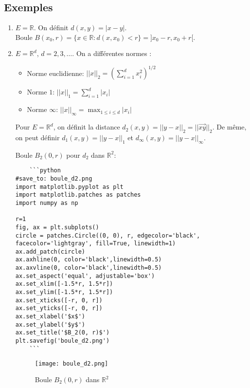 \documentclass[oneside]{book}
\begin{document}
\subsection{Exemples}

\begin{example}
\begin{enumerate}
    \item $E = \mathbb{R}$. On définit $d(x, y) = |x - y|$. \\
    Boule $B(x_0, r) = \{x \in \mathbb{R} : d(x, x_0) < r \} = ]x_0 - r, x_0 + r[$.

    \item $E = \mathbb{R}^d$, $d = 2, 3, \dots$. On a différentes normes :
    \begin{itemize}
        \item Norme euclidienne: $||x||_2 = (\sum_{i=1}^d x_i^2)^{1/2}$
        \item Norme $1$: $||x||_1 = \sum_{i=1}^d |x_i|$
        \item Norme $\infty$: $||x||_\infty = \max_{1 \leq i \leq d} |x_i|$
    \end{itemize}
    Pour $E = \mathbb{R}^d$, on définit la distance $d_2(x, y) = ||y - x||_2 = ||\overrightarrow{xy}||_2$. De même, on peut définir $d_1(x, y) = ||y - x||_1$ et $d_\infty(x, y) = ||y - x||_\infty$.

    Boule $B_2(0, r)$ pour $d_2$ dans $\mathbb{R}^2$:

    \begin{verbatim}
    ```python
#save_to: boule_d2.png
import matplotlib.pyplot as plt
import matplotlib.patches as patches
import numpy as np

r=1
fig, ax = plt.subplots()
circle = patches.Circle((0, 0), r, edgecolor='black', facecolor='lightgray', fill=True, linewidth=1)
ax.add_patch(circle)
ax.axhline(0, color='black',linewidth=0.5)
ax.axvline(0, color='black',linewidth=0.5)
ax.set_aspect('equal', adjustable='box')
ax.set_xlim([-1.5*r, 1.5*r])
ax.set_ylim([-1.5*r, 1.5*r])
ax.set_xticks([-r, 0, r])
ax.set_yticks([-r, 0, r])
ax.set_xlabel('$x$')
ax.set_ylabel('$y$')
ax.set_title('$B_2(0, r)$')
plt.savefig('boule_d2.png')
    ```
    \end{verbatim}

    \begin{figure}[H]
        \centering
        \texttt{[image: boule\_d2.png]}
        \caption{Boule $B_2(0, r)$ dans $\mathbb{R}^2$}
        \label{fig:boule_d2}
    \end{figure}


\end{enumerate}
\end{example}
\end{document}
